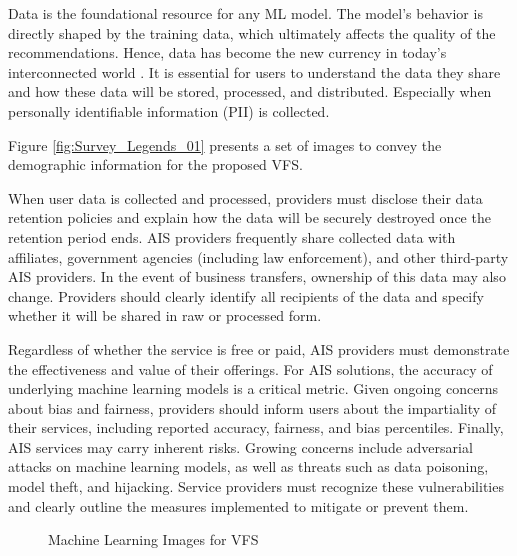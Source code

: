 \documentclass[manuscript,review,anonymous]{acmart}
\begin{document}

	Data is the foundational resource for any ML model. The model’s behavior is directly shaped by the training data, which ultimately affects the quality of the recommendations. Hence, data has become the new currency in today's interconnected world \cite{Gates:2014:DNC:2683467.2683477}. It is essential for users to understand the data they share and how these data will be stored, processed, and distributed. Especially when personally identifiable information (PII) is collected.

	Figure \ref{fig:Survey_Legends_01} presents a set of images to convey the demographic information for the proposed VFS.

	When user data is collected and processed, providers must disclose their data retention policies and explain how the data will be securely destroyed once the retention period ends. AIS providers frequently share collected data with affiliates, government agencies (including law enforcement), and other third-party AIS providers. In the event of business transfers, ownership of this data may also change. Providers should clearly identify all recipients of the data and specify whether it will be shared in raw or processed form.

	Regardless of whether the service is free or paid, AIS providers must demonstrate the effectiveness and value of their offerings. For AIS solutions, the accuracy of underlying machine learning models is a critical metric. Given ongoing concerns about bias and fairness, providers should inform users about the impartiality of their services, including reported accuracy, fairness, and bias percentiles. Finally, AIS services may carry inherent risks. Growing concerns include adversarial attacks on machine learning models, as well as threats such as data poisoning, model theft, and hijacking. Service providers must recognize these vulnerabilities and clearly outline the measures implemented to mitigate or prevent them.
	\begin{figure}[!t]
		\begin{minipage}{0.48\textwidth}
			\centering
			\scalebox{0.42} {}
			\caption{Demography Images for VFS}
			\label{fig:Survey_Legends_01}
		\end{minipage}
		\hfill %
		\begin{minipage}{0.48\textwidth}
			\centering
			\scalebox{0.42} {}
			\caption{Machine Learning Images for VFS}
			\label{fig:Survey_Legends_04}
		\end{minipage}
	\end{figure}
\end{document}
